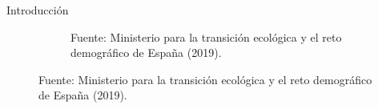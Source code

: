 \documentclass[spanish,a4paper]{beamer}%
\begin{document}
\begin{frame}{Introducción}
{\begin{figure}
\begin{subfigure}[b]{0.4\textwidth}
			\caption*{Fuente: Ministerio para la transición ecológica y el reto demográfico de España (2019).}
		\end{subfigure}
		\label{fig:demandaYconsumo}
	\end{figure}
}
\end{frame}
\end{document}
